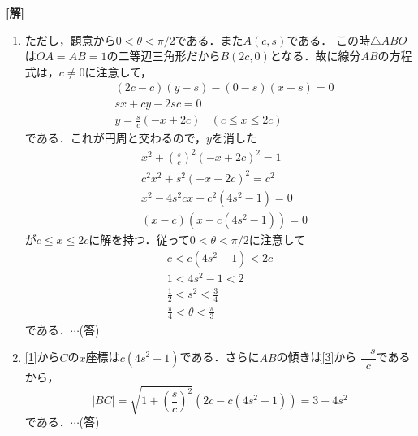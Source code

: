 \documentclass[a4j]{jarticle}
\begin{document}
\begin{multicols}{2}
{\bf[解]}
\begin{enumerate}[(1)]
\item
 \1 ただし，題意から$0<\theta<\pi/2$である．また$A(c,s)$である．
この時$\triangle ABO$は$OA=AB=1$の二等辺三角形だから$B(2c,0)$となる．故に線分$AB$の方程式は，$c\not=0$に注意して，
      \begin{align}
      &(2c-c)(y-s)-(0-s)(x-s)=0     \nonumber\\
      &sx+cy-2sc=0                     \nonumber\\
      &y=\frac{s}{c}(-x+2c) \,\,\,\,\ (c\le x\le2c) \label{3}
      \end{align}
である．これが円周と交わるので，$y$を消した
     \begin{align}
     &x^2+\left(\frac{s}{c}\right)^2(-x+2c)^2=1  \nonumber\\
     &c^2x^2+s^2(-x+2c)^2=c^2 \nonumber\\
     &x^2-4s^2cx+c^2(4s^2-1)=0  \nonumber\\
     &(x-c)\left(x-c(4s^2-1)\right)=0  \label{1}
     \end{align}
が$c\le x\le2c$に解を持つ．従って$0<\theta<\pi/2$に注意して
     \begin{align}
     c<c(4s^2-1)<2c \nonumber\\
     1<4s^2-1<2 \nonumber\\
     \frac{1}{2}<s^2<\frac{3}{4} \label{4}\\
     \frac{\pi}{4}<\theta<\frac{\pi}{3}\label{2}
     \end{align}
である．$\cdots$(答)

     \item\eqref{1}から$C$の$x$座標は$c(4s^2-1)$である．さらに$AB$の傾きは\eqref{3}から
     $\dfrac{-s}{c}$であるから，
          \[|BC|=\sqrt{1+\left(\frac{s}{c}\right)^2}(2c-c(4s^2-1))=3-4s^2\]
     である．$\cdots$(答)
     

\end{enumerate}
\end{multicols}
\end{document}
